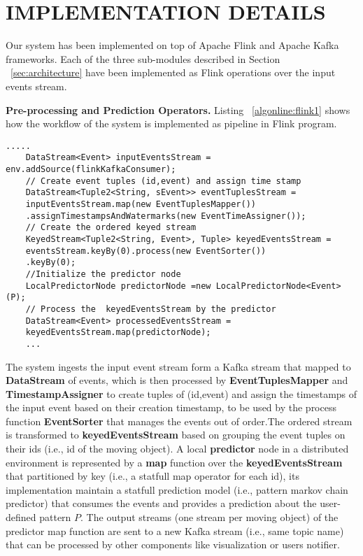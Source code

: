 

\section{IMPLEMENTATION DETAILS}

Our system has been implemented on top of Apache Flink and Apache Kafka frameworks. Each of the three sub-modules described in Section  ~\ref{sec:architecture} have been implemented as Flink operations over the input events stream. 

\textbf{Pre-processing and Prediction Operators.} Listing ~\ref{algonline:flink1} shows how the workflow of the system is implemented as pipeline in Flink program.


	\begin{lstlisting}[caption={Flink pipeline for local predictors workflow},label={algonline:flink1},frame=single]
	.....
	DataStream<Event> inputEventsStream = env.addSource(flinkKafkaConsumer);	
	// Create event tuples (id,event) and assign time stamp 
	DataStream<Tuple2<String, sEvent>> eventTuplesStream =
	inputEventsStream.map(new EventTuplesMapper())
	.assignTimestampsAndWatermarks(new EventTimeAssigner());	
	// Create the ordered keyed stream 
	KeyedStream<Tuple2<String, Event>, Tuple> keyedEventsStream =
	eventsStream.keyBy(0).process(new EventSorter())
	.keyBy(0);	
	//Initialize the predictor node 
	LocalPredictorNode predictorNode =new LocalPredictorNode<Event>(P);
	// Process the  keyedEventsStream by the predictor 
	DataStream<Event> processedEventsStream =
	keyedEventsStream.map(predictorNode);
	...
	\end{lstlisting}
	
The system ingests the input event stream form a Kafka stream that mapped to \textbf{DataStream} of events, which is then processed by \textbf{EventTuplesMapper} and  \textbf{TimestampAssigner} to create tuples of (id,event) and assign the timestamps of the input event based on their creation timestamp, to be used by the process function \textbf{EventSorter} that manages the events out of order.The ordered stream is transformed to \textbf{keyedEventsStream}  based on grouping the event tuples on their ids (i.e., id of the moving object). A local \textbf{predictor} node in a distributed environment is represented by a \textbf{map} function over the \textbf{keyedEventsStream} that partitioned by key (i.e., a statfull  map operator for each id), its implementation maintain a statfull prediction model (i.e., pattern markov chain predictor)  that consumes the events and  provides a prediction about the user-defined pattern $P$. The output streams (one stream per moving object) of the predictor map function are sent to a new Kafka stream (i.e., same topic name) that can be processed by other components like visualization or users notifier.


